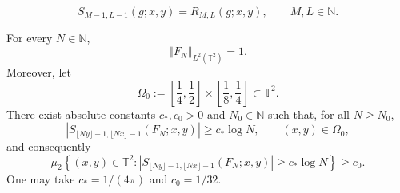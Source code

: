 \documentclass[10pt,a4paper]{amsart}
\begin{document}
\begin{equation}  \label{eq:S-R-relation}
S_{M-1,L-1}(g;x,y)=R_{M,L}(g;x,y), \qquad M,L\in\mathbb{N }.
\end{equation}

\begin{proposition}
\label{prop:block} For every $N\in \mathbb{N}$, 
\begin{equation*}
\left\Vert F_{N}\right\Vert _{L^{2}(\mathbb{T}^{2})}=1.
\end{equation*}%
Moreover, let 
\begin{equation*}
\Omega _{0}:=\left[ \frac{1}{4},\frac{1}{2}\right] \times \left[ \frac{1}{8},%
\frac{1}{4}\right] \subset \mathbb{T}^{2}.
\end{equation*}%
There exist absolute constants $c_{\ast},c_0>0$ and $N_0\in\mathbb{N}$ such
that, for all $N\ge N_0$, 
\begin{equation}
\left|S_{\lfloor Ny\rfloor-1,\lfloor Nx\rfloor-1}(F_N;x,y)\right| \ge
c_{\ast}\log N, \qquad (x,y)\in\Omega_0,  \label{eq:block-large-S}
\end{equation}
and consequently 
\begin{equation*}
\mu_2\left\{(x,y)\in\mathbb{T}^2: \left|S_{\lfloor Ny\rfloor-1,\lfloor
Nx\rfloor-1}(F_N;x,y)\right| \ge c_{\ast}\log N\right\} \ge c_0.
\end{equation*}
One may take $c_{\ast}=1/(4\pi)$ and $c_0=1/32$.
\end{proposition}
\end{document}
